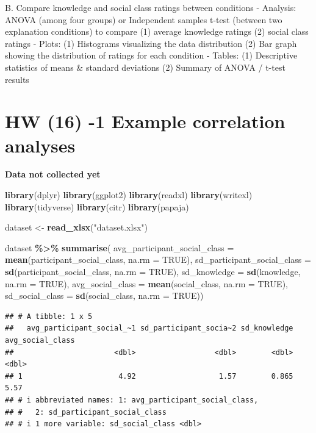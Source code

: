 \documentclass[
  man]{apa6}
\newenvironment{Shaded}{\begin{snugshade}}{\end{snugshade}}
\newcommand{\AttributeTok}[1]{\textcolor[rgb]{0.13,0.29,0.53}{#1}}
\newcommand{\ConstantTok}[1]{\textcolor[rgb]{0.56,0.35,0.01}{#1}}
\newcommand{\FunctionTok}[1]{\textcolor[rgb]{0.13,0.29,0.53}{\textbf{#1}}}
\newcommand{\NormalTok}[1]{#1}
\newcommand{\OtherTok}[1]{\textcolor[rgb]{0.56,0.35,0.01}{#1}}
\newcommand{\SpecialCharTok}[1]{\textcolor[rgb]{0.81,0.36,0.00}{\textbf{#1}}}
\newcommand{\StringTok}[1]{\textcolor[rgb]{0.31,0.60,0.02}{#1}}
\begin{document}
B. Compare knowledge and social class ratings between conditions
- Analysis: ANOVA (among four groups) or Independent samples t-test (between two explanation conditions) to compare (1) average knowledge ratings (2) social class ratings
- Plots: (1) Histograms visualizing the data distribution (2) Bar graph showing the distribution of ratings for each condition
- Tables: (1) Descriptive statistics of means \& standard deviations (2) Summary of ANOVA / t-test results

\hypertarget{hw-16--1-example-correlation-analyses}{%
\section{HW (16) -1 Example correlation analyses}\label{hw-16--1-example-correlation-analyses}}

\textbf{Data not collected yet}

\begin{Shaded}
\begin{Highlighting}[]
\FunctionTok{library}\NormalTok{(dplyr)}
\FunctionTok{library}\NormalTok{(ggplot2)}
\FunctionTok{library}\NormalTok{(readxl)}
\FunctionTok{library}\NormalTok{(writexl)}
\FunctionTok{library}\NormalTok{(tidyverse)}
\FunctionTok{library}\NormalTok{(citr)}
\FunctionTok{library}\NormalTok{(papaja)}

\NormalTok{dataset }\OtherTok{\textless{}{-}} \FunctionTok{read\_xlsx}\NormalTok{(}\StringTok{"dataset.xlsx"}\NormalTok{)}

\NormalTok{dataset }\SpecialCharTok{\%\textgreater{}\%}
  \FunctionTok{summarise}\NormalTok{(}
    \AttributeTok{avg\_participant\_social\_class =} \FunctionTok{mean}\NormalTok{(participant\_social\_class, }\AttributeTok{na.rm =} \ConstantTok{TRUE}\NormalTok{),}
    \AttributeTok{sd\_participant\_social\_class =} \FunctionTok{sd}\NormalTok{(participant\_social\_class, }\AttributeTok{na.rm =} \ConstantTok{TRUE}\NormalTok{),}
    \AttributeTok{sd\_knowledge =} \FunctionTok{sd}\NormalTok{(knowledge, }\AttributeTok{na.rm =} \ConstantTok{TRUE}\NormalTok{),}
    \AttributeTok{avg\_social\_class =} \FunctionTok{mean}\NormalTok{(social\_class, }\AttributeTok{na.rm =} \ConstantTok{TRUE}\NormalTok{),}
    \AttributeTok{sd\_social\_class =} \FunctionTok{sd}\NormalTok{(social\_class, }\AttributeTok{na.rm =} \ConstantTok{TRUE}\NormalTok{))}
\end{Highlighting}
\end{Shaded}

\begin{verbatim}
## # A tibble: 1 x 5
##   avg_participant_social_~1 sd_participant_socia~2 sd_knowledge avg_social_class
##                       <dbl>                  <dbl>        <dbl>            <dbl>
## 1                      4.92                   1.57        0.865             5.57
## # i abbreviated names: 1: avg_participant_social_class,
## #   2: sd_participant_social_class
## # i 1 more variable: sd_social_class <dbl>
\end{verbatim}
\end{document}
